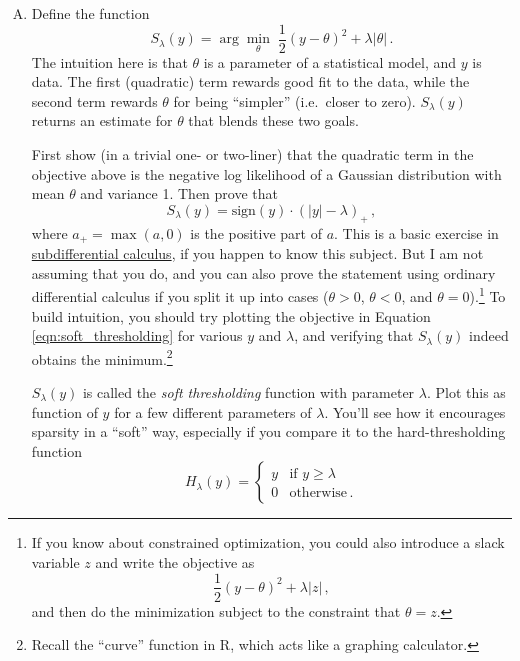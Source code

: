 \documentclass{mynotes}
\begin{document}
\begin{enumerate}[(A)]
\item Define the function
\begin{equation}
\label{eqn:soft_thresholding}
S_\lambda(y) = \arg \min_{\theta} \; \frac{1}{2}(y - \theta)^2 + \lambda | \theta | \, .
\end{equation}
The intuition here is that $\theta$ is a parameter of a statistical model, and $y$ is data.   The first (quadratic) term rewards good fit to the data, while the second term rewards $\theta$ for being ``simpler'' (i.e.~closer to zero).  $S_\lambda(y)$ returns an estimate for $\theta$ that blends these two goals.

First show (in a trivial one- or two-liner) that the quadratic term in the objective above is the negative log likelihood of a Gaussian distribution with mean $\theta$ and variance 1.  Then prove that 
$$
S_\lambda(y) = \mbox{sign}(y) \cdot (|y| - \lambda)_+ \, ,
$$
where $a_+ = \max(a,0)$ is the positive part of $a$.  This is a basic exercise in \href{http://ocw.mit.edu/courses/electrical-engineering-and-computer-science/6-253-convex-analysis-and-optimization-spring-2012/lecture-notes/MIT6_253S12_lec12.pdf}{subdifferential calculus}, if you happen to know this subject.  But I am not assuming that you do, and you can also prove the statement using ordinary differential calculus if you split it up into cases ($\theta>0$, $\theta<0$, and $\theta=0$).\footnote[][-5pc]{If you know about constrained optimization, you could also introduce a slack variable $z$ and write the objective as
$$
\frac{1}{2}(y - \theta)^2 + \lambda | z | \, ,
$$
and then do the minimization subject to the constraint that $\theta = z$.}  To build intuition, you should try plotting the objective in Equation \ref{eqn:soft_thresholding} for various $y$ and $\lambda$, and verifying that $S_\lambda(y)$ indeed obtains the minimum.\footnote{Recall the ``curve'' function in R, which acts like a graphing calculator.}

$S_\lambda(y)$ is called the \textit{soft thresholding} function with parameter $\lambda$.  Plot this as function of $y$ for a few different parameters of $\lambda$.  You'll see how it encourages sparsity in a ``soft'' way, especially if you compare it to the hard-thresholding function
$$
H_{\lambda}(y) = 
\left \{
\begin{array}{ll}
y & \mbox{if $y \geq \lambda$} \\
0 & \mbox{otherwise} \, .
\end{array}
\right.
$$



\end{enumerate}
\end{document}

